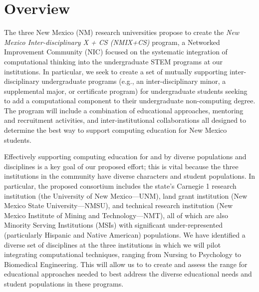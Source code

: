 \section{Overview}
\label{sec:overview}

The three New Mexico (NM) research universities propose to create the \emph{New Mexico Inter-disciplinary X + CS (NMIX+CS)} program, a Networked Improvement Community (NIC) focused on the systematic integration of computational thinking into the undergraduate STEM programs at our institutions. In particular, we seek to create
a set of mutually supporting inter-disciplinary undergraduate programs (e.g., an inter-disciplinary minor, a supplemental major, or
certificate program) for undergraduate students seeking to add a computational component to their undergraduate non-computing
degree. The program will include a combination of educational approaches, mentoring and recruitment activities, and inter-institutional collaborations all designed to determine the best way to support computing education for New Mexico students.

Effectively supporting computing education for and by diverse populations
and disciplines is a key goal of our proposed effort; this is vital because the three institutions in the community have diverse
characters and student populations. In particular, the proposed consortium includes the state's Carnegie 1 research institution (the University of New Mexico---UNM), land grant institution (New Mexico State University---NMSU), and technical research institution (New Mexico Institute of Mining and Technology---NMT), all of which
are also Minority Serving Institutions (MSIs) with significant under-represented (particularly Hispanic
and Native American) populations. We have identified a diverse set of disciplines at the three institutions in which we will pilot integrating computational techniques, ranging from Nursing to Psychology to Biomedical Engineering. This will allow us to to create and assess the range for educational approaches needed to best address the diverse educational needs and student populations in these programs.


